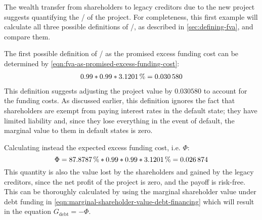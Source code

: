 \documentclass[main.tex]{subfiles}
\begin{document}
        The wealth transfer from shareholders to legacy creditors due to the new project 
        suggests quantifying the \FVA/ of the project.
        For completeness, this first example will calculate all three possible definitions of \FVA/,
        as described in \cref{sec:defining-fva}, and compare them.

        The first possible definition of \FVA/ as the promised excess funding cost can be determined by
        \cref{eqn:fva-as-promised-excess-funding-cost}:
            \begin{align}
                \num{0.99} * \num{0.99} * \pct{0.031201} = \num{0.030580}
            \end{align}
        This definition suggests adjusting the project value by $\num{0.030580}$ to account for the funding costs.
        As discussed earlier, this definition ignores the fact that shareholders are exempt from paying
        interest rates in the default state; they have limited liability and, since they lose everything
        in the event of default, the marginal value to them in default states is zero.
        
        Calculating instead the expected excess funding cost, i.e. $\Phi$:
            \begin{equation}
                \Phi 
                = \pct{0.878787} * \num{0.99}  * \num{0.99} * \pct{0.031201} 
                = \num{0.026874}
            \end{equation}
        This quantity is also the value lost by the shareholders and gained by the legacy creditors,
        since the net profit of the project is zero, and the payoff is risk-free.
        This can be thoroughly calculated by using the marginal shareholder value under debt funding in 
        \cref{eqn:marginal-shareholder-value-debt-financing}
        which will result in the equation $G_{\text{debt}} = -\Phi$. 
        
\end{document}
